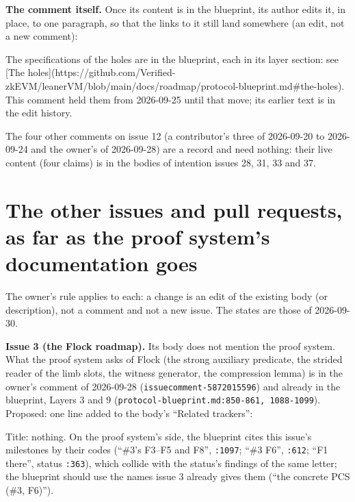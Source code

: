 \textbf{The comment itself.} Once its content is in the blueprint, its author edits it, in place, to one paragraph, so that the links to it still land somewhere (an edit, not a new comment):

\begin{srccode}
The specifications of the holes are in the blueprint, each in its layer section: see
[The holes](https://github.com/Verified-zkEVM/leanerVM/blob/main/docs/roadmap/protocol-blueprint.md#the-holes).
This comment held them from 2026-09-25 until that move; its earlier text is in the edit history.
\end{srccode}

The four other comments on issue 12 (a contributor's three of 2026-09-20 to 2026-09-24 and the owner's of 2026-09-28) are a record and need nothing: their live content (four claims) is in the bodies of intention issues 28, 31, 33 and 37.

\section{The other issues and pull requests, as far as the proof system's documentation goes}\label{sec:docs-text-issues}

The owner's rule applies to each: a change is an edit of the existing body (or description), not a comment and not a new issue. The states are those of 2026-09-30.

\begin{sloppypar}
\textbf{Issue 3 (the Flock roadmap).} Its body does not mention the proof system. What the proof system asks of Flock (the strong auxiliary predicate, the strided reader of the limb slots, the witness generator, the compression lemma) is in the owner's comment of 2026-09-28 (\texttt{issuecomment-\allowbreak{}5872015596}) and already in the blueprint, Layers 3 and 9 (\texttt{protocol-\allowbreak{}blueprint.\allowbreak{}md:\allowbreak{}850-\allowbreak{}861,\allowbreak{} 1088-\allowbreak{}1099}). Proposed: one line added to the body's ``Related trackers'':
\end{sloppypar}


\begin{sloppypar}
Title: nothing. On the proof system's side, the blueprint cites this issue's milestones by their codes (``\#3's F3–F5 and F8'', \texttt{:\allowbreak{}1097}; ``\#3 F6'', \texttt{:\allowbreak{}612}; ``F1 there'', status \texttt{:\allowbreak{}363}), which collide with the status's findings of the same letter; the blueprint should use the names issue 3 already gives them (``the concrete PCS (\#3, F6)'').
\end{sloppypar}

